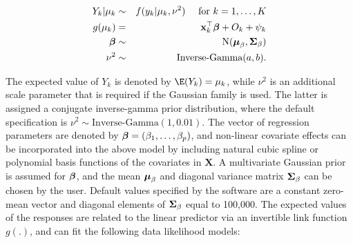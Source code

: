 \documentclass[article,shortnames,nojss]{jss}
\newcommand{\bd}[1]{\ensuremath{\mbox{\boldmath $#1$}}}
\begin{document}
\begin{eqnarray}
Y_{k}|\mu_{k}&\sim&f(y_{k}|\mu_{k},\nu^{2})~~~~\mbox{for }k=1,\ldots,K\label{equation likelihood}\\
g(\mu_{k})&=& \mathbf{x}_{k}^{\top}\bd{\beta} + O_k + \psi_{k}\nonumber\\
\bd{\beta}&\sim&\mbox{N}(\bd{\mu}_{\beta}, \bd{\Sigma}_{\beta})\nonumber\\
\nu^2 &\sim& \mbox{Inverse-Gamma}(a,b).\nonumber
\end{eqnarray}

The expected value of $Y_{k}$ is denoted by $\E(Y_{k})=\mu_{k}$, while $\nu^{2}$ is an additional scale parameter that is required if the Gaussian family is used. The latter is assigned a conjugate inverse-gamma prior distribution,  where the default specification is $\nu^{2}\sim\mbox{Inverse-Gamma}(1, 0.01)$. The vector of regression parameters are denoted by $\bd{\beta}=(\beta_{1},\ldots,\beta_{p})$, and non-linear covariate effects can be incorporated into the above model by including natural cubic spline or polynomial basis functions of the covariates in $\mathbf{X}$. A multivariate Gaussian prior is assumed for $\bd{\beta}$, and the mean $\bd{\mu}_{\beta}$ and diagonal variance matrix $\bd{\Sigma}_{\beta}$ can be chosen by the user. Default values specified by the software are a constant zero-mean vector and diagonal elements of  $\bd{\Sigma}_{\beta}$ equal to 100,000. The expected values of the responses are related to the linear predictor via an invertible link function $g(.)$, and  can fit the following data likelihood models:
\end{document}
